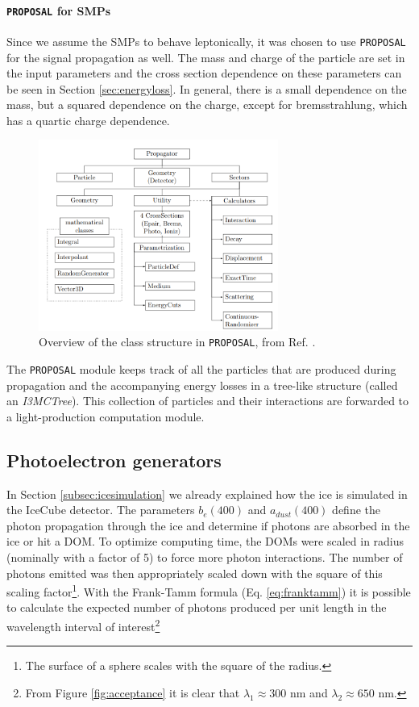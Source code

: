 \paragraph{\texttt{PROPOSAL} for SMPs}
Since we assume the SMPs to behave leptonically, it was chosen to use \texttt{PROPOSAL} for the signal propagation as well. The mass and charge of the particle are set in the input parameters and the cross section dependence on these parameters can be seen in Section \ref{sec:energyloss}. In general, there is a small dependence on the mass, but a squared dependence on the charge, except for bremsstrahlung, which has a quartic charge dependence.\\

\begin{figure}
\centering
\includegraphics[width=0.7\textwidth]{chapter6/img/proposal.png}
\caption{Overview of the class structure in \texttt{PROPOSAL}, from Ref. \cite{Dunsch:2018nsc}.}
\label{fig:proposal}
\end{figure}

\noindent The \texttt{PROPOSAL} module keeps track of all the particles that are produced during propagation and the accompanying energy losses in a tree-like structure (called an \textit{I3MCTree}). This collection of particles and their interactions are forwarded to a light-production computation module.

\subsection{Photoelectron generators}
In Section \ref{subsec:icesimulation} we already explained how the ice is simulated in the IceCube detector. The parameters $b_e(400)$ and $a_{dust}(400)$ define the photon propagation through the ice and determine if photons are absorbed in the ice or hit a DOM. To optimize computing time, the DOMs were scaled in radius (nominally with a factor of 5) to force more photon interactions. The number of photons emitted was then appropriately scaled down with the square of this scaling factor\footnote{The surface of a sphere scales with the square of the radius.}. With the Frank-Tamm formula (Eq. \ref{eq:franktamm}) it is possible to calculate the expected number of photons produced per unit length in the wavelength interval of interest\footnote{From Figure \ref{fig:acceptance} it is clear that $\lambda_1 \approx 300$ nm and $\lambda_2 \approx 650$ nm.}

